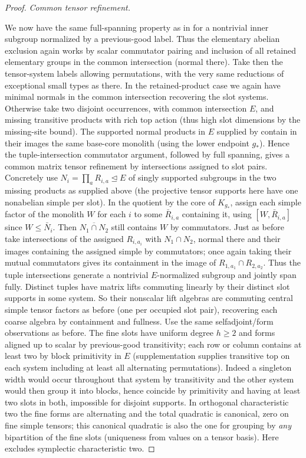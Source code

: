 \begin{proof}
\noindent\emph{Common tensor refinement.}

We now have the same full-spanning property as in  for a nontrivial inner subgroup normalized by a previous-good label. Thus the elementary abelian exclusion again works by scalar commutator pairing and inclusion of all retained elementary groups in the common intersection (normal there). Take then the tensor-system labels allowing permutations, with the very same reductions of exceptional small types as there. In the retained-product case we again have minimal normals in the common intersection recovering the slot systems. Otherwise take two disjoint occurrences, with common intersection \(E\), and missing transitive products with rich top action (thus high slot dimensions by the missing-site bound). The supported normal products in \(E\) supplied by  contain in their images the same base-core monolith (using the lower endpoint \(g_*\)). Hence the tuple-intersection commutator argument, followed by full spanning, gives a common matrix tensor refinement by intersections assigned to slot pairs. Concretely use \(N_i=\prod_a R_{i,a}\trianglelefteq E\) of singly supported subgroups in the two missing products as supplied above (the projective tensor supports here have one nonabelian simple per slot). In the quotient by the core of \(K_{g_*}\), assign each simple factor of the monolith \(W\) for each \(i\) to some \(\bar R_{i,a}\) containing it, using \([W,\bar R_{i,a}]\) since \(W\le\bar N_i\). Then \(\overline{N_1\cap N_2}\) still contains \(W\) by commutators. Just as before take intersections of the assigned \(R_{i,a_i}\) with \(N_1\cap N_2\), normal there and their images containing the assigned simple by commutators; once again taking their mutual commutators gives its containment in the image of \(R_{1,a_1}\cap R_{2,a_2}\). Thus the tuple intersections generate a nontrivial \(E\)-normalized subgroup and jointly span fully. Distinct tuples have matrix lifts commuting linearly by their distinct slot supports in some system. So their nonscalar lift algebras are commuting central simple tensor factors as before (one per occupied slot pair), recovering each coarse algebra by containment and fullness. Use the same selfadjoint/form observations as before. The fine slots have uniform degree \(h\ge2\) and forms aligned up to scalar by previous-good transitivity; each row or column contains at least two by block primitivity in \(E\) (supplementation supplies transitive top on each system including at least all alternating permutations). Indeed a singleton width would occur throughout that system by transitivity and the other system would then group it into blocks, hence coincide by primitivity and having at least two slots in both, impossible for disjoint supports. In orthogonal characteristic two the fine forms are alternating and the total quadratic is canonical, zero on fine simple tensors; this canonical quadratic is also the one for grouping by \emph{any} bipartition of the fine slots (uniqueness from values on a tensor basis). Here  excludes symplectic characteristic two.


\end{proof}
